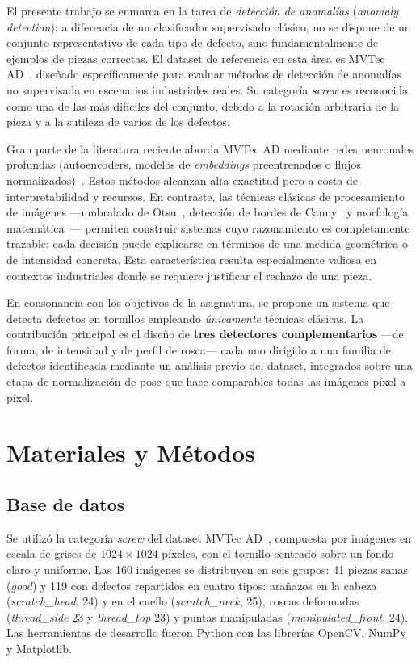 \documentclass[final]{article}
\begin{document}
El presente trabajo se enmarca en la tarea de \emph{detección de anomalías}
(\textit{anomaly detection}): a diferencia de un clasificador supervisado
clásico, no se dispone de un conjunto representativo de cada tipo de defecto,
sino fundamentalmente de ejemplos de piezas correctas. El dataset de referencia
en esta área es MVTec AD~\cite{bergmann2019mvtec}, diseñado específicamente
para evaluar métodos de detección de anomalías no supervisada en escenarios
industriales reales. Su categoría \emph{screw} es reconocida como una de las
más difíciles del conjunto, debido a la rotación arbitraria de la pieza y a la
sutileza de varios de los defectos.

Gran parte de la literatura reciente aborda MVTec AD mediante redes neuronales
profundas (autoencoders, modelos de \textit{embeddings} preentrenados o flujos
normalizados)~\cite{bergmann2019mvtec}. Estos métodos alcanzan alta exactitud
pero a costa de interpretabilidad y recursos. En contraste, las técnicas
clásicas de procesamiento de imágenes —umbralado de Otsu~\cite{otsu1979},
detección de bordes de Canny~\cite{canny1986} y morfología
matemática~\cite{gonzalez2018}— permiten construir sistemas cuyo razonamiento
es completamente trazable: cada decisión puede explicarse en términos de una
medida geométrica o de intensidad concreta. Esta característica resulta
especialmente valiosa en contextos industriales donde se requiere justificar
el rechazo de una pieza.

En consonancia con los objetivos de la asignatura, se propone un sistema que
detecta defectos en tornillos empleando \emph{únicamente} técnicas clásicas.
La contribución principal es el diseño de \textbf{tres detectores
complementarios} —de forma, de intensidad y de perfil de rosca— cada uno
dirigido a una familia de defectos identificada mediante un análisis previo
del dataset, integrados sobre una etapa de normalización de pose que hace
comparables todas las imágenes píxel a píxel.

\section{Materiales y Métodos}

\subsection{Base de datos}

Se utilizó la categoría \emph{screw} del dataset MVTec
AD~\cite{bergmann2019mvtec}, compuesta por imágenes en escala de grises de
$1024\times1024$ píxeles, con el tornillo centrado sobre un fondo claro y
uniforme. Las 160 imágenes se distribuyen en seis grupos: 41 piezas sanas
(\emph{good}) y 119 con defectos repartidos en cuatro tipos:
arañazos en la cabeza (\emph{scratch\_head}, 24) y en el cuello
(\emph{scratch\_neck}, 25), roscas deformadas (\emph{thread\_side} 23 y
\emph{thread\_top} 23) y puntas manipuladas (\emph{manipulated\_front}, 24).
Las herramientas de desarrollo fueron Python con las librerías OpenCV, NumPy
y Matplotlib.
\end{document}
